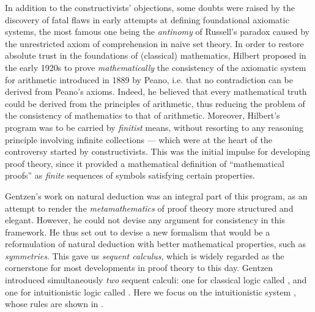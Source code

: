 In addition to the constructivists' objections, some doubts were raised by the
discovery of fatal flaws in early attempts at defining foundational axiomatic
systems, the most famous one being the \emph{antinomy} of Russell's paradox
caused by the unrestricted axiom of comprehension in naive set theory. In order
to restore absolute trust in the foundations of (classical) mathematics, Hilbert
proposed in the early 1920s to prove \emph{mathematically} the consistency of
the axiomatic system for arithmetic introduced in 1889 by Peano, i.e.
that no contradiction can be derived from Peano's axioms. Indeed, he believed
that every mathematical truth could be derived from the principles of
arithmetic, thus reducing the problem of the consistency of mathematics to that
of arithmetic. Moreover, Hilbert's program was to be carried by \emph{finitist}
means, without resorting to any reasoning principle involving infinite
collections --- which were at the heart of the controversy started by
constructivists. This was the initial impulse for developing proof theory, since
it provided a mathematical definition of ``mathematical proofs'' as
\emph{finite} sequences of symbols satisfying certain properties.

Gentzen's work on natural deduction was an integral part of this program, as an
attempt to render the \emph{metamathematics} of proof theory more structured and
elegant. However, he could not devise any argument for consistency in this
framework. He thus set out to devise a new formalism that would be a
reformulation of natural deduction with better mathematical properties, such as
\emph{symmetries}. This gave us \emph{sequent calculus}, which is widely
regarded as the cornerstone for most developments in proof theory to this day.
Gentzen introduced simultaneously \emph{two} sequent calculi: one for classical
logic called , and one for intuitionistic logic called . Here we
focus on the intuitionistic system , whose rules are shown in
.

